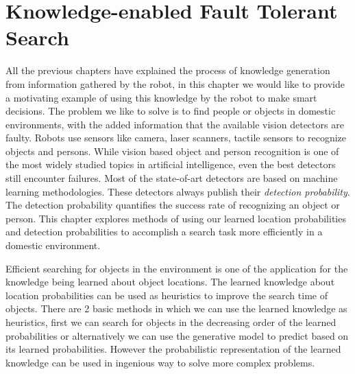 \chapter{Knowledge-enabled Fault Tolerant Search}
\label{cha: search}

All the previous chapters have explained the process of knowledge generation from information gathered by the robot, in this chapter we would like to provide a motivating example of using this knowledge by the robot to make smart decisions. The problem we like to solve is to find people or objects in domestic environments, with the added information that the available vision detectors are faulty\cite{Hoffman14Lsda, zhou2014recent}. Robots use sensors like camera, laser scanners, tactile sensors  to recognize objects and persons. While vision based object and person recognition is one of the most widely studied topics in artificial intelligence, even the best detectors still encounter failures. Most of the state-of-art detectors are based on machine learning methodologies. These detectors always publish their \emph{detection probability}. The detection probability quantifies the success rate of recognizing an object or person. This chapter explores methods of using our learned location probabilities and detection probabilities to accomplish a search task more efficiently in a domestic environment. 


Efficient searching for objects in the environment is one of the application for the knowledge being learned about object locations. The learned knowledge about location probabilities can be used as heuristics to improve the search time of objects. There are 2 basic methods in which we can use the learned knowledge as heuristics, first we can search for objects in the decreasing order of the learned probabilities or alternatively we can use the generative model to predict based on its learned probabilities. However the probabilistic representation of the learned knowledge can be used in ingenious way to solve more complex problems. 

